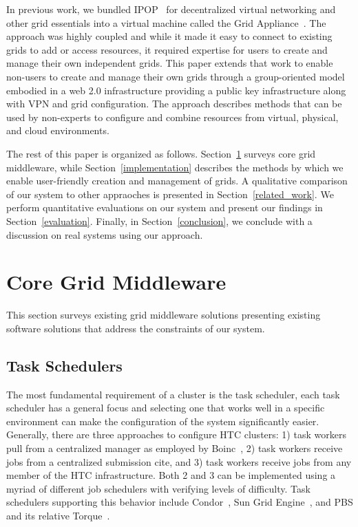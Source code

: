 \documentclass{sig-alternate}
\begin{document}
In previous work, we bundled IPOP~\cite{ipop} for decentralized virtual
networking and other grid essentials into a virtual machine called the
Grid Appliance~\cite{grid_appliance}.  The approach was highly coupled and
while it made it easy to connect to existing grids to add or access resources,
it required expertise for users to create and manage their own independent
grids.  This paper extends that work to enable non-users to create and manage
their own grids through a group-oriented model embodied in a web 2.0
infrastructure providing a public key infrastructure along with VPN and grid
configuration.  The approach describes methods that can be used by non-experts
to configure and combine resources from virtual, physical, and cloud
environments.

The rest of this paper is organized as follows.  Section~\ref{middleware}
surveys core grid middleware, while Section~\ref{implementation} describes
the methods by which we enable user-friendly creation and management of grids.
A qualitative comparison of our system to other appraoches is presented in
Section~\ref{related_work}.  We perform quantitative evaluations on our system
and present our findings in Section~\ref{evaluation}.  Finally, in
Section~\ref{conclusion}, we conclude with a discussion on real systems using
our approach.

\section{Core Grid Middleware}
\label{middleware}
This section surveys existing grid middleware solutions presenting existing
software solutions that address the constraints of our system.

\subsection{Task Schedulers}
The most fundamental requirement of a cluster is the task scheduler, each
task scheduler has a general focus and selecting one that works well in a
specific environment can make the configuration of the system significantly
easier.  Generally, there are three approaches to configure HTC clusters: 1)
task workers pull from a centralized manager as employed by Boinc~\cite{boinc},
2) task workers receive jobs from a centralized submission cite, and 3) task
workers receive jobs from any member of the HTC infrastructure.  Both 2 and 3
can be implemented using a myriad of different job schedulers with verifying
levels of difficulty.  Task schedulers supporting this behavior include
Condor~\cite{condor0}, Sun Grid Engine~\cite{grid_engine}, and PBS and its
relative Torque~\cite{torque}.
\end{document}
